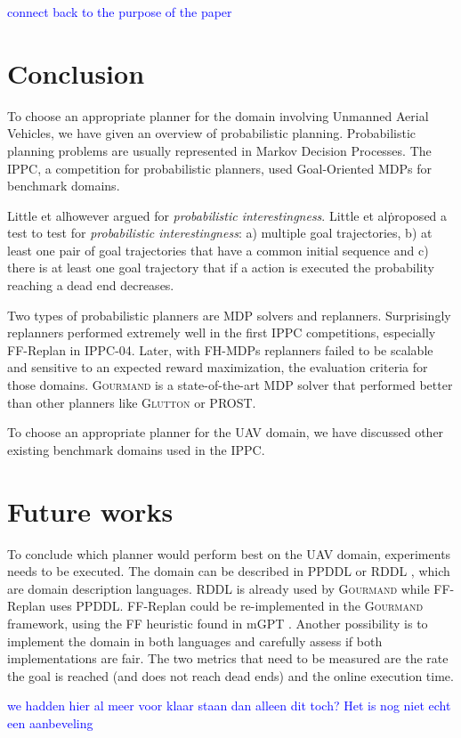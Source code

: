 \documentclass[runningheads,a4paper]{llncs}
\newcommand\todo[1]{\textcolor{blue}{#1}}
\begin{document}
\todo{connect back to the purpose of the paper}


\section{Conclusion}
\label{sec:conclusion}

To choose an appropriate planner for the domain involving Unmanned Aerial
Vehicles, we have given an overview of probabilistic planning. Probabilistic
planning problems are usually represented in Markov Decision Processes. The
IPPC, a competition for probabilistic planners, used Goal-Oriented MDPs for
benchmark domains.

Little et al\. however argued for \emph{probabilistic
interestingness}. Little et al\. proposed a test to test for \emph{probabilistic
interestingness}: a) multiple goal trajectories, b) at least one pair of goal
trajectories that have a common initial sequence and c) there is at least one
goal trajectory that if a action is executed the probability reaching a dead
end decreases.

Two types of probabilistic planners are MDP solvers and replanners.
Surprisingly replanners performed extremely well in the first IPPC
competitions, especially FF-Replan in IPPC-04. Later, with FH-MDPs replanners
failed to be scalable and sensitive to an expected reward maximization, the
evaluation criteria for those domains. \textsc{Gourmand} is a state-of-the-art
MDP solver that performed better than other planners like \textsc{Glutton} or
PROST.

To choose an appropriate planner for the UAV domain, we have discussed other
existing benchmark domains used in the IPPC.



\section{Future works}

To conclude which planner would perform best on the UAV domain, experiments
needs to be executed. The domain can be described in PPDDL
\cite{younes2004ppddl1} or RDDL \cite{Sanner:RDDL}, which are domain
description languages. RDDL is already used by \textsc{Gourmand} while
FF-Replan uses PPDDL\@. FF-Replan could be re-implemented in the
\textsc{Gourmand} framework, using the FF heuristic found in mGPT
\cite{bonet2011planning}. Another possibility is to implement the domain in
both languages and carefully assess if both implementations are fair.  The two
metrics that need to be measured are the rate the goal is reached (and does not
reach dead ends) and the online execution time.

\todo{we hadden hier al meer voor klaar staan dan alleen dit toch? Het is nog niet echt een aanbeveling}



\end{document}

